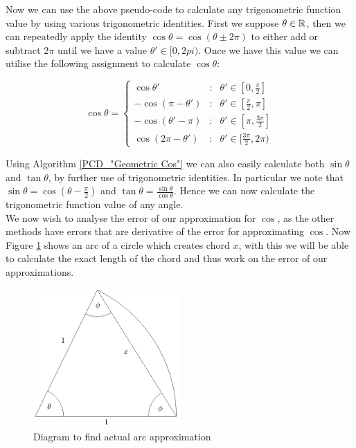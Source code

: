 Now we can use the above pseudo-code to calculate any trigonometric function value by using various trigonometric identities. First we  suppose \(\theta \in \mathbb{R}\), then we can repeatedly apply the identity \(\cos\theta = \cos(\theta \pm 2\pi)\) to either add or subtract \(2\pi\) until we have a value \(\theta' \in [0, 2pi)\). Once we have this value we can utilise the following assignment to calculate \(\cos\theta\):

\begin{displaymath}
	\cos\theta = \left\{ \begin{array}{lcl}
			\cos\theta' & : & \theta' \in [0, \frac{\pi}{2}]\\
			-\cos(\pi - \theta') & : & \theta' \in [\frac{\pi}{2}, \pi]\\
			-\cos(\theta' - \pi) & : & \theta' \in [\pi, \frac{3\pi}{2}]\\
			\cos(2\pi - \theta') & : & \theta' \in [\frac{3\pi}{2}, 2\pi)
		\end{array}\right.
\end{displaymath}

Using Algorithm \ref{PCD_"Geometric Cos"} we can also easily calculate both \(\sin\theta\) and \(\tan\theta\), by further use of trigonometric identities. In particular we note that \(\sin\theta = \cos(\theta - \frac{\pi}{2})\) and \(\tan\theta = \frac{\sin\theta}{\cos\theta}\). Hence we can now calculate the trigonometric function value of any angle.\\

We now wish to analyse the error of our approximation for \(\cos\), as the other methods have errors that are derivative of the error for approximating \(\cos\). Now Figure \ref{FIG_"Geometric Trig 4"} shows an arc of a circle which creates chord \(x\), with this we will be able to calculate the exact length of the chord and thus work on the error of our approximations.\\

\begin{figure}[!ht]
	\caption{Diagram to find actual arc approximation}
	\label{FIG_"Geometric Trig 4"}
	\centering
	\includegraphics[width=0.5\textwidth]{"./Diagrams/Geometric Trig Diagram 4"}
\end{figure}

